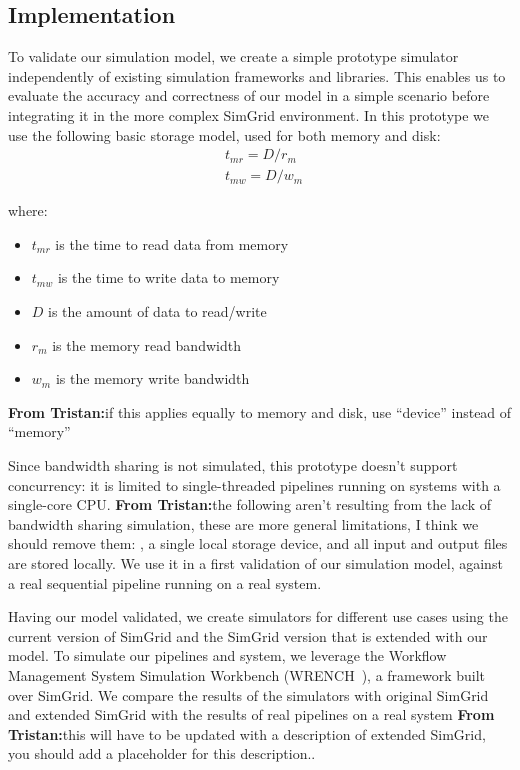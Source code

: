 \documentclass[conference]{IEEEtran}
\newcommand{\tristan}[1]{\color{orange}\textbf{From Tristan:}#1\color{black}}
\begin{document}
		\subsection{Implementation}

			To validate our simulation model, we create a simple prototype
			simulator independently of existing simulation frameworks and libraries. 
			This enables us to evaluate the accuracy and correctness of our 
			model in a simple scenario before integrating it in the more complex SimGrid environment. 
			In this prototype we use the following basic storage model, used for both memory and disk: 
			\begin{align*}
				& t_{mr} = D / r_m \\ 
				& t_{mw} = D / w_m\
			\end{align*}		
			
			where:
			\begin{itemize}
				\item $t_{mr}$ is the time to read data from memory
				\item $t_{mw}$ is the time to write data to memory
				\item $D$ is the amount of data to read/write
				\item $r_m$ is the memory read bandwidth
				\item $w_m$ is the  memory write bandwidth
			\end{itemize}			
			\tristan{if this applies equally to memory and disk, use ``device'' instead of ``memory''}

			Since bandwidth sharing is not simulated, this prototype doesn't support concurrency: it is limited 
			to single-threaded pipelines running on systems 
			with a single-core CPU. \tristan{the following aren't resulting from the lack of bandwidth sharing simulation, these are more general limitations, I think we 
			should remove them: , a single local storage device, and all input and 
			output files are stored locally.} We use it in a first validation of our simulation model,
			against a real sequential pipeline running on
			a real system.
			
			Having our model validated, we create simulators for different use cases 
			using the current version of SimGrid and the SimGrid version that is 
			extended with our model. To simulate our pipelines and system, we leverage the Workflow Management System Simulation Workbench (WRENCH~\cite{wrench}), a framework  
			built over SimGrid.
		    We compare the results of the simulators with
			original SimGrid and extended SimGrid with the results of real
			pipelines on a real system \tristan{this will have to be updated with a description of extended SimGrid, 
			you should add a placeholder for this description.}. 
		
\end{document}
